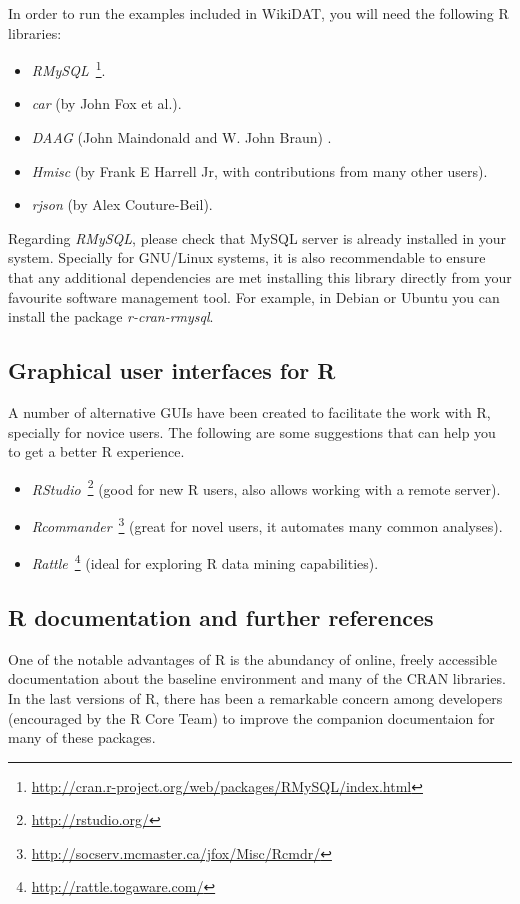 In order to run the examples included in WikiDAT, you will need the following
R libraries:

\begin{itemize}
  \item \textit{RMySQL}~\footnote{\url{http://cran.r-project.org/web/packages/RMySQL/index.html}}.
  \item \textit{car} (by John Fox et al.).
  \item \textit{DAAG} (John Maindonald and W. John Braun) .
  \item \textit{Hmisc} (by Frank E Harrell Jr, with contributions from many other users).
  \item \textit{rjson} (by Alex Couture-Beil).
 \end{itemize}

Regarding \textit{RMySQL}, please check that MySQL server is already installed
in your system. Specially for GNU/Linux systems, it is also recommendable to
ensure that any additional dependencies are met installing this library directly
from your favourite software management tool. For example, in Debian or Ubuntu
you can install the package \textit{r-cran-rmysql}.

\subsection{Graphical user interfaces for R}
A number of alternative GUIs have been created to facilitate the work with R, 
specially for novice users. The following are some suggestions that can help 
you to get a better R experience.

\begin{itemize}
 \item \textit{RStudio}~\footnote{\url{http://rstudio.org/}} (good for new R 
 users, also allows working with a remote server).
 \item \textit{Rcommander}~\footnote{\url{http://socserv.mcmaster.ca/jfox/Misc/Rcmdr/}} 
 (great for novel users, it automates many common analyses).
 \item \textit{Rattle}~\footnote{\url{http://rattle.togaware.com/}} (ideal for 
 exploring R data mining capabilities).
\end{itemize}

\subsection{R documentation and further references}
One of the notable advantages of R is the abundancy of online, freely accessible
documentation about the baseline environment and many of the CRAN libraries.
In the last versions of R, there has been a remarkable concern among developers
(encouraged by the R Core Team) to improve the companion documentaion for many
of these packages.


